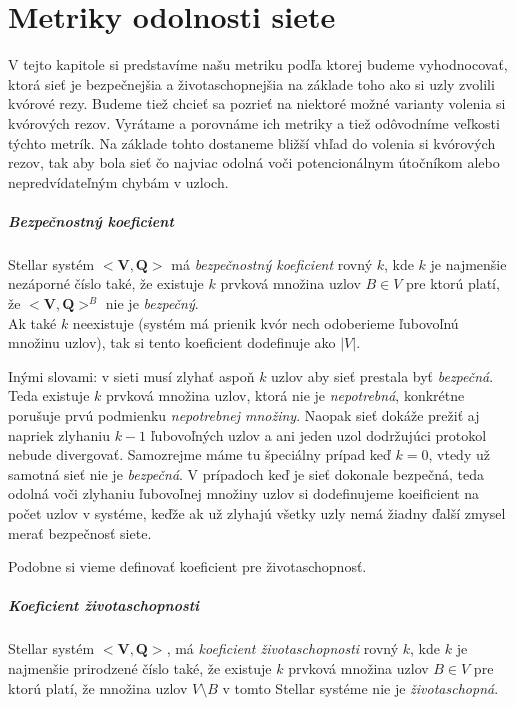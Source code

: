 \chapter{Metriky odolnosti siete}

V tejto kapitole si predstavíme našu metriku podľa ktorej budeme vyhodnocovať,
ktorá sieť je bezpečnejšia a životaschopnejšia na základe toho ako si uzly
zvolili kvórové rezy.
Budeme tiež chcieť sa pozrieť na niektoré možné varianty volenia si kvórových
rezov. Vyrátame a  porovnáme ich metriky a tiež odôvodníme veľkosti týchto metrík.
Na základe tohto dostaneme bližší vhľad do volenia si kvórových rezov, tak aby
bola sieť čo najviac odolná voči potencionálnym útočníkom alebo nepredvídateľným
chybám v uzloch.

\paragraph {Bezpečnostný koeficient} Stellar systém $<\textbf{V},\textbf{Q}>$
má \textit{bezpečnostný koeficient} rovný $k$,
kde $k$ je najmenšie nezáporné číslo také, že existuje $k$ prvková množina
uzlov $B \in V$ pre ktorú platí, že $<\textbf{V}, \textbf{Q}>^B$ nie je
\textit{bezpečný}.\\
Ak také $k$ neexistuje (systém má prienik kvór nech odoberieme
ľubovoľnú množinu uzlov), tak si tento koeficient dodefinuje ako $|V|$.

\vspace{4mm}
Inými slovami: v sieti musí zlyhať aspoň $k$ uzlov aby sieť prestala byť
\textit{bezpečná}. Teda existuje $k$ prvková množina uzlov, ktorá nie je
\textit{nepotrebná}, konkrétne porušuje prvú podmienku \textit{nepotrebnej množiny}.
Naopak sieť dokáže prežiť aj napriek zlyhaniu $k-1$ ľubovoľných uzlov a ani
jeden uzol dodržujúci protokol nebude divergovať.
Samozrejme máme tu špeciálny prípad keď $k=0$, vtedy už samotná sieť nie je
\textit{bezpečná}.
V prípadoch keď je sieť dokonale bezpečná, teda odolná voči zlyhaniu ľubovoľnej
množiny uzlov si dodefinujeme koeificient na počet uzlov v systéme, keďže ak
už zlyhajú všetky uzly nemá žiadny ďalší zmysel merať bezpečnosť siete.

Podobne si vieme definovať koeficient pre životaschopnosť.

\paragraph {Koeficient životaschopnosti} Stellar systém $<\textbf{V},\textbf{Q}>$,
má \textit{koeficient životaschopnosti} rovný $k$, kde $k$ je najmenšie prirodzené
číslo také, že existuje $k$ prvková množina uzlov $B \in V$ pre ktorú platí, že
množina uzlov $V \setminus B$ v tomto Stellar systéme nie je \textit{životaschopná}.

